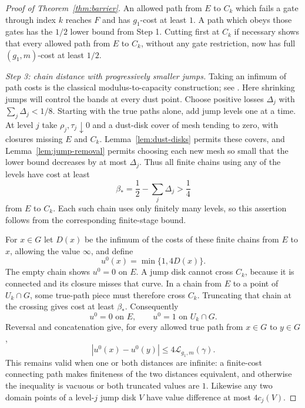 \begin{proof}[Proof of Theorem~\ref{thm:barrier}]
An allowed path from $E$ to $C_k$ which fails a gate through index
$k$ reaches $F$ and has $g_1$-cost at least $1$.  A path which obeys
those gates has the $1/2$ lower bound from Step 1.  Cutting first
at $C_k$ if necessary shows that every allowed path from $E$ to
$C_k$, without any gate restriction, now has full $(g_1,m)$-cost
at least $1/2$.

\emph{Step 3: chain distance with progressively smaller jumps.}
Taking an infimum of path costs is the classical modulus-to-capacity
construction; see \cite[Proposition~2.17]{HeinonenKoskela1998}.
Here shrinking jumps will control the bands at every dust point.
Choose positive losses $\Delta_j$ with $\sum_j\Delta_j<1/8$.
Starting with the true paths alone, add jump levels one at a time.
At level $j$ take $\rho_j,\tau_j\downarrow0$ and a dust-disk cover
of mesh tending to zero, with closures missing $E$ and $C_k$.
Lemma~\ref{lem:dust-disks} permits these covers, and
Lemma~\ref{lem:jump-removal} permits choosing each new mesh so small
that the lower bound decreases by at most $\Delta_j$.  Thus all
finite chains using any of the levels have cost at least
\[
 \beta_*=\frac12-\sum_j\Delta_j>\frac14
\]
from $E$ to $C_k$.  Each such chain uses only finitely many levels,
so this assertion follows from the corresponding finite-stage bound.

For $x\in G$ let $D(x)$ be the infimum of the costs of these finite
chains from $E$ to $x$, allowing the value $\infty$, and define
\begin{equation}\label{eq:barrier-chain-distance}
 u^0(x)=\min\{1,4D(x)\}.
\end{equation}
The empty chain shows $u^0=0$ on $E$.  A jump disk cannot cross
$C_k$, because it is connected and its closure misses that curve.
In a chain from $E$ to a point of $U_k\cap G$, some true-path piece
must therefore cross $C_k$.  Truncating that chain at the crossing
gives cost at least $\beta_*$.  Consequently
\begin{equation}\label{eq:barrier-constant-regions}
 u^0=0\text{ on }E,
 \qquad u^0=1\text{ on }U_k\cap G.
\end{equation}
Reversal and concatenation give, for every allowed true path
from $x\in G$ to $y\in G$,
\begin{equation}\label{eq:barrier-path-inequality}
 |u^0(x)-u^0(y)|\le4\mathcal L_{g_1,m}(\gamma).
\end{equation}
This remains valid when one or both distances are infinite: a
finite-cost connecting path makes finiteness of the two distances
equivalent, and otherwise the inequality is vacuous or both truncated
values are $1$.  Likewise any two domain points of a level-$j$ jump
disk $V$ have value difference at most $4c_j(V)$.


\end{proof}
